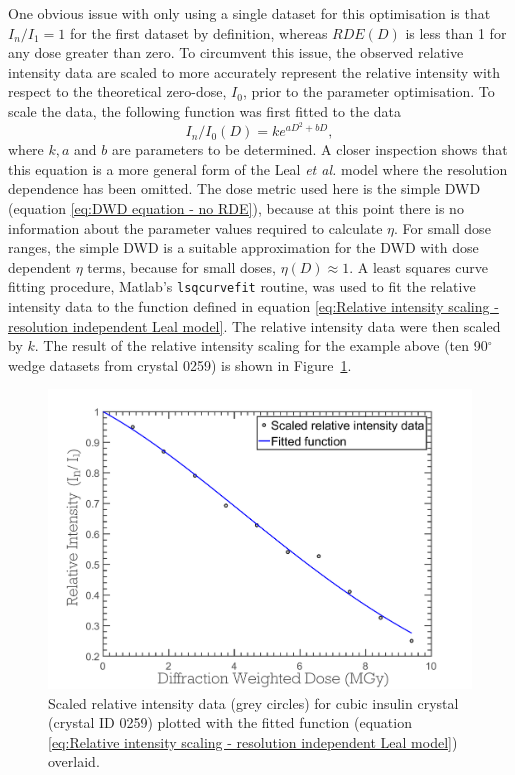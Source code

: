 One obvious issue with only using a single dataset for this optimisation is that $I_n/I_1 = 1$ for the first dataset by definition, whereas $RDE(D)$ is less than 1 for any dose greater than zero.
To circumvent this issue, the observed relative intensity data are scaled to more accurately represent the relative intensity with respect to the theoretical zero-dose, $I_0$, prior to the parameter optimisation.
To scale the data, the following function was first fitted to the data
\begin{equation}
    I_n/I_0(D) = k e^{aD^2 + bD},
    \label{eq:Relative intensity scaling - resolution independent Leal model}
\end{equation}
where $k, a$ and $b$ are parameters to be determined.
A closer inspection shows that this equation is a more general form of the Leal \textit{et al.} model where the resolution dependence has been omitted.
The dose metric used here is the simple DWD (equation \ref{eq:DWD equation - no RDE}), because at this point there is no information about the parameter values required to calculate $\eta$.
For small dose ranges, the simple DWD is a suitable approximation for the DWD with dose dependent $\eta$ terms, because for small doses, $\eta(D) \approx 1$.
A least squares curve fitting procedure, Matlab's \verb+lsqcurvefit+ routine, was used to fit the relative intensity data to the function defined in equation \ref{eq:Relative intensity scaling - resolution independent Leal model}.
The relative intensity data were then scaled by $k$.
The result of the relative intensity scaling for the example above (ten 90$^{\circ}$ wedge datasets from crystal 0259) is shown in Figure~\ref{fig:Scaled relative intensity data - ZDE}.
\begin{figure}
  \centering
    \includegraphics[width=1\textwidth]{figures/zde/ScaledFunctionFitPlot.pdf}
    \caption[Scaled relative intensity decay.]{Scaled relative intensity data (grey circles) for cubic insulin crystal (crystal ID 0259) plotted with the fitted function (equation \ref{eq:Relative intensity scaling - resolution independent Leal model}) overlaid.}
    \label{fig:Scaled relative intensity data - ZDE}
\end{figure}
